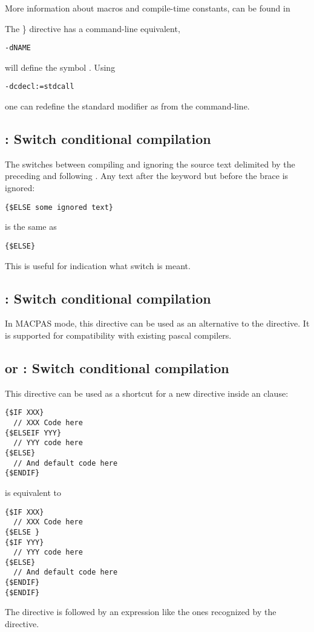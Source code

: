 More information about macros and compile-time constants, can be found in

The \} directive has a command-line equivalent, 
\begin{verbatim}
-dNAME
\end{verbatim}
will define the symbol . Using
\begin{verbatim}
-dcdecl:=stdcall
\end{verbatim}
one can redefine the standard modifier  as 
from the command-line.

\subsection{ : Switch conditional compilation}

The  switches between compiling and ignoring the source
text delimited by the preceding  and following
. Any text after the  keyword but before the
brace is ignored:
\begin{verbatim}
{$ELSE some ignored text}
\end{verbatim}
is the same as
\begin{verbatim}
{$ELSE}
\end{verbatim}
This is useful for indication what switch is meant.

\subsection{ : Switch conditional compilation}
In MACPAS mode, this directive can be used as an alternative to the 
directive. It is supported for compatibility with existing \macos pascal
compilers.

\subsection{ or  : Switch conditional compilation}
This directive can be used as a shortcut for a new
 directive inside an  clause:
\begin{verbatim}
{$IF XXX}
  // XXX Code here
{$ELSEIF YYY}
  // YYY code here
{$ELSE}
  // And default code here
{$ENDIF}
\end{verbatim}
is equivalent to
\begin{verbatim}
{$IF XXX}
  // XXX Code here
{$ELSE }
{$IF YYY}
  // YYY code here
{$ELSE}
  // And default code here
{$ENDIF}
{$ENDIF}
\end{verbatim}
The directive is followed by an expression like the ones recognized by the 
 directive.

